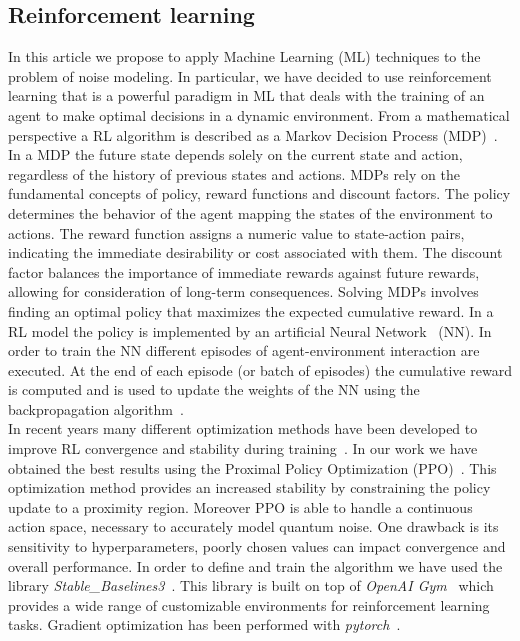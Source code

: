 \documentclass[referee,sn-basic]{sn-jnl} %
\begin{document}
\subsection{Reinforcement learning}\label{sec_rl}
In this article we propose to apply Machine Learning (ML) techniques to the problem of noise modeling.
In particular, we have decided to use reinforcement learning that is a powerful paradigm in ML that deals with the training of an agent to make 
optimal decisions in a dynamic environment. From a mathematical perspective a RL algorithm is described as a Markov Decision Process (MDP)~\cite{PUTERMAN1990331}. 
In a MDP the future state depends solely on the current state and action, regardless of the history of previous states and actions. 
MDPs rely on the fundamental concepts of policy, reward functions and discount factors. 
The policy determines the behavior of the agent mapping the states of the environment to actions. 
The reward function assigns a numeric value to state-action pairs, indicating the immediate desirability or cost associated with them. 
The discount factor balances the importance of immediate rewards against future rewards, allowing for consideration of long-term consequences. 
Solving MDPs involves finding an optimal policy that maximizes the expected cumulative reward.
In a RL model the policy is implemented by an artificial Neural Network~\cite{Zou2009} (NN). 
In order to train the NN different episodes of agent-environment interaction are executed. 
At the end of each episode (or batch of episodes) the cumulative reward is computed and is used to update the weights of the NN using the backpropagation 
algorithm~\cite{Rojas1996}.\\
In recent years many different optimization methods have been developed to improve RL convergence and stability during training~\cite{ozalp2020}. 
In our work we have obtained the best results using the Proximal Policy Optimization (PPO)~\cite{schulman2017proximal}. 
This optimization method provides an increased stability by constraining the policy update to a proximity region. 
Moreover PPO is able to handle a continuous action space, necessary to accurately model quantum noise. 
One drawback is its sensitivity to hyperparameters, poorly chosen values can impact convergence and overall performance. 
In order to define and train the algorithm we have used the library \textit{Stable\_Baselines3}~\cite{JMLR:v22:20-1364}. 
This library is built on top of \textit{OpenAI Gym}~\cite{article_gym} which provides a wide range of customizable environments for reinforcement 
learning tasks. Gradient optimization has been performed with \textit{pytorch}~\cite{NEURIPS2019_9015}.
\end{document}
